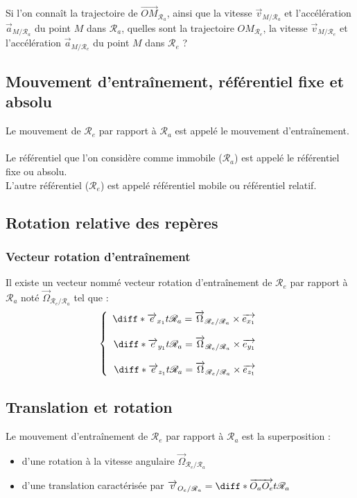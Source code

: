 \documentclass[a4paper,10pt]{book} %
\begin{document}
Si l'on connaît la trajectoire de $\overrightarrow{OM}_{\mathcal{R}_a}$, ainsi que la vitesse $\overrightarrow{v}_{M/\mathcal{R}_a}$ et l'accélération $\overrightarrow{a}_{M/\mathcal{R}_a}$ du point $M$ dans $\mathcal{R}_a$, quelles sont la trajectoire $OM_{\mathcal{R}_e}$, la vitesse $\overrightarrow{v}_{M/\mathcal{R}_e}$ et l'accélération $\overrightarrow{a}_{M/\mathcal{R}_e}$ du point $M$ dans $\mathcal{R}_e$ ?

\subsection{Mouvement d’entraînement, référentiel fixe et absolu}
Le mouvement de $\mathcal{R}_e$ par rapport à $\mathcal{R}_a$ est appelé le mouvement d’entraînement.\\\\
Le référentiel que l'on considère comme immobile  ($\mathcal{R}_a$) est appelé le référentiel fixe ou absolu.\\ L'autre référentiel ($\mathcal{R}_e$) est appelé référentiel mobile ou référentiel relatif.

\newpage

\subsection{Rotation relative des repères}
\subsubsection{Vecteur rotation d'entraînement}
Il existe un vecteur nommé vecteur rotation d'entraînement de $\mathcal{R}_e$ par rapport à\\
$\mathcal{R}_a$ noté $\overrightarrow{\Omega}_{\mathcal{R}_e/\mathcal{R}_a}$ tel que :
$$\left\{\begin{array}{rcl} \diff*{\overrightarrow{e}_{x_1}}{t}{\mathcal{R}_a}=\overrightarrow{\Omega}_{\mathcal{R}_e/\mathcal{R}_a}\times\overrightarrow{e_{x_1}}\\\\
\diff*{\overrightarrow{e}_{y_1}}{t}{\mathcal{R}_a}=\overrightarrow{\Omega}_{\mathcal{R}_e/\mathcal{R}_a}\times\overrightarrow{e_{y_1}}\\\\
\diff*{\overrightarrow{e}_{z_1}}{t}{\mathcal{R}_a}=\overrightarrow{\Omega}_{\mathcal{R}_e/\mathcal{R}_a}\times\overrightarrow{e_{z_1}}
\end{array}\right.$$

\subsection{Translation et rotation}
Le mouvement d’entraînement de $\mathcal{R}_e$ par rapport à $\mathcal{R}_a$ est la superposition :
\begin{itemize}[label=$\bullet$]
\item d'une rotation à la vitesse angulaire $\overrightarrow{\Omega}_{\mathcal{R}_e/\mathcal{R}_a}$
\item d'une translation caractérisée par $\overrightarrow{v}_{O_e/\mathcal{R}_a}=\diff*{\overrightarrow{O_aO_e}}{t}{\mathcal{R}_a}$
\end{itemize}
\end{document}
